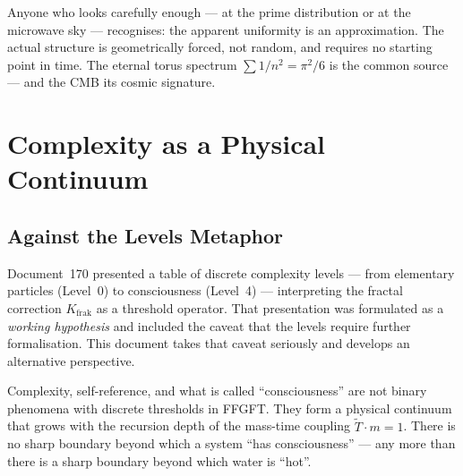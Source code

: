 \begin{table}[ht]
\centering
{}
\caption{Primes and CMB anisotropies as instances of the same eternal spectrum}
\end{table}

Anyone who looks carefully enough — at the prime distribution or at the
microwave sky — recognises: the apparent uniformity is an approximation.
The actual structure is geometrically forced, not random, and requires
no starting point in time. The eternal torus spectrum $\sum 1/n^2 = \pi^2/6$
is the common source — and the CMB its cosmic signature.
\section{Complexity as a Physical Continuum}

\subsection{Against the Levels Metaphor}

Document~170 presented a table of discrete complexity levels — from elementary
particles (Level~0) to consciousness (Level~4) — interpreting the fractal correction
$K_\text{frak}$ as a threshold operator. That presentation was formulated as a
\textit{working hypothesis} and included the caveat that the levels require further
formalisation. This document takes that caveat seriously and develops an alternative
perspective.

\begin{important}
Complexity, self-reference, and what is called ``consciousness'' are not binary
phenomena with discrete thresholds in FFGFT.
They form a physical continuum that grows with the recursion depth of the
mass-time coupling $\tilde{T} \cdot m = 1$.
There is no sharp boundary beyond which a system ``has consciousness'' — any more
than there is a sharp boundary beyond which water is ``hot''.
\end{important}

